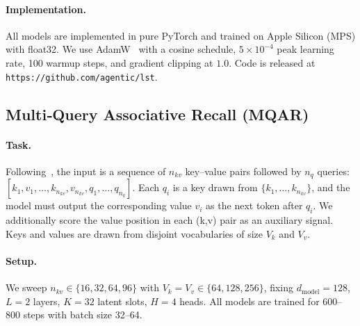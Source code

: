 \documentclass[10pt,twocolumn,letterpaper]{article}
\begin{document}
\paragraph{Implementation.}  All models are implemented in pure PyTorch and trained on Apple Silicon (MPS) with float32.  We use AdamW~\cite{loshchilov2017adamw} with a cosine schedule, $5\!\times\!10^{-4}$ peak learning rate, 100 warmup steps, and gradient clipping at $1.0$.  Code is released at \verb|https://github.com/agentic/lst|.

\subsection{Multi‑Query Associative Recall (MQAR)}
\label{sec:mqar}

\paragraph{Task.}  Following~\cite{arora2023simple,arora2024theoretical}, the input is a sequence of $n_{kv}$ key–value pairs followed by $n_q$ queries: $[k_1, v_1, \dots, k_{n_{kv}}, v_{n_{kv}}, q_1, \dots, q_{n_q}]$.  Each $q_i$ is a key drawn from $\{k_1,\dots,k_{n_{kv}}\}$, and the model must output the corresponding value $v_i$ as the next token after $q_i$.  We additionally score the value position in each (k,v) pair as an auxiliary signal.  Keys and values are drawn from disjoint vocabularies of size $V_k$ and $V_v$.

\paragraph{Setup.}  We sweep $n_{kv}\in\{16,32,64,96\}$ with $V_k\!=\!V_v\!\in\!\{64,128,256\}$, fixing $d_{\text{model}}\!=\!128$, $L\!=\!2$ layers, $K\!=\!32$ latent slots, $H\!=\!4$ heads.  All models are trained for 600–800 steps with batch size 32–64.
\end{document}
